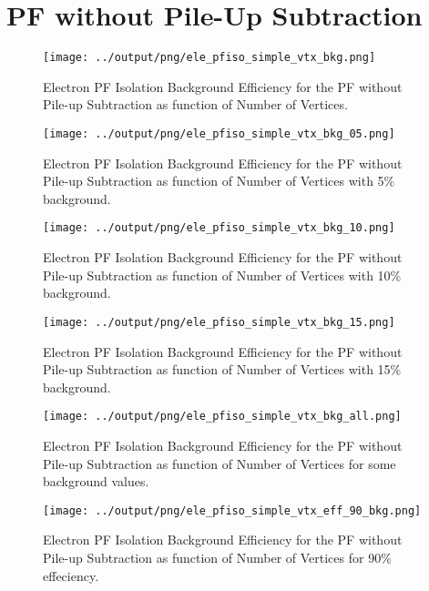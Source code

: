 \documentclass[11pt]{book}
\begin{document}
\section{PF without Pile-Up Subtraction}
\begin{figure}[htb]
\centering
\texttt{[image: ../output/png/ele\_pfiso\_simple\_vtx\_bkg.png]}
\caption{Electron PF Isolation Background Efficiency for the PF without Pile-up Subtraction as function of Number of Vertices.}
\label{fig:ele_pfiso_vtx_bkg_simple}
\end{figure}

\begin{figure}[htb]
\centering
\texttt{[image: ../output/png/ele\_pfiso\_simple\_vtx\_bkg\_05.png]}
\caption{Electron PF Isolation Background Efficiency for the PF without Pile-up Subtraction as function of Number of Vertices with 5\% background.}
\label{fig:ele_pfiso_vtx_bkg_simple_bkg_05}
\end{figure}

\begin{figure}[htb]
\centering
\texttt{[image: ../output/png/ele\_pfiso\_simple\_vtx\_bkg\_10.png]}
\caption{Electron PF Isolation Background Efficiency for the PF without Pile-up Subtraction as function of Number of Vertices with 10\% background.}
\label{fig:ele_pfiso_vtx_bkg_simple_bkg_10}
\end{figure}

\begin{figure}[htb]
\centering
\texttt{[image: ../output/png/ele\_pfiso\_simple\_vtx\_bkg\_15.png]}
\caption{Electron PF Isolation Background Efficiency for the PF without Pile-up Subtraction as function of Number of Vertices with 15\% background.}
\label{fig:ele_pfiso_vtx_bkg_simple_bkg_15}
\end{figure}

\begin{figure}[htb]
\centering
\texttt{[image: ../output/png/ele\_pfiso\_simple\_vtx\_bkg\_all.png]}
\caption{Electron PF Isolation Background Efficiency for the PF without Pile-up Subtraction as function of Number of Vertices for some background values.}
\label{fig:ele_pfiso_vtx_bkg_simple_bkg_all}
\end{figure}

\begin{figure}[htb]
\centering
\texttt{[image: ../output/png/ele\_pfiso\_simple\_vtx\_eff\_90\_bkg.png]}
\caption{Electron PF Isolation Background Efficiency for the PF without Pile-up Subtraction as function of Number of Vertices for 90\% effeciency.}
\label{fig:ele_pfiso_vtx_eff_simple_eff_90_bkg}
\end{figure}
\end{document}
